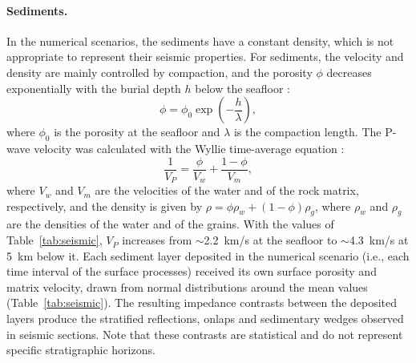 \paragraph{Sediments.}
In the numerical scenarios, the sediments have a constant density, which is not appropriate to
represent their seismic properties. For sediments, the velocity and density are mainly
controlled by compaction, and the porosity $\phi$ decreases exponentially with the burial
depth $h$ below the seafloor \citep{Athy1930}:
\begin{equation}
  \phi = \phi_0 \exp\left(-\frac{h}{\lambda}\right),
  \label{eq:athy}
\end{equation}
where $\phi_0$ is the porosity at the seafloor and $\lambda$ is the compaction length. The
P-wave velocity was calculated with the Wyllie time-average equation \citep{Wyllie1956}:
\begin{equation}
  \frac{1}{V_P} = \frac{\phi}{V_w} + \frac{1 - \phi}{V_m},
  \label{eq:wyllie}
\end{equation}
where $V_w$ and $V_m$ are the velocities of the water and of the rock matrix, respectively,
and the density is given by $\rho = \phi \rho_w + (1 - \phi) \rho_g$, where $\rho_w$ and
$\rho_g$ are the densities of the water and of the grains. With the values of
Table~\ref{tab:seismic}, $V_P$ increases from $\sim$2.2~km/s at the seafloor to $\sim$4.3~km/s
at 5~km below it. Each sediment layer deposited in the numerical scenario (i.e., each time
interval of the surface processes) received its own surface porosity and matrix velocity,
drawn from normal distributions around the mean values (Table~\ref{tab:seismic}). The
resulting impedance contrasts between the deposited layers produce the stratified
reflections, onlaps and sedimentary wedges observed in seismic sections. Note that these
contrasts are statistical and do not represent specific stratigraphic horizons.

